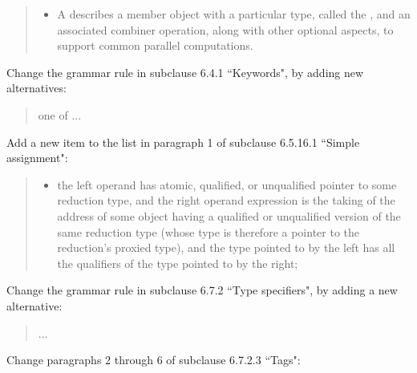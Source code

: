 \begin{quote}
\begin{itemize}
\item
A
describes a member object with a particular type,
called the
,
and an associated combiner operation,
along with other optional aspects,
to support common parallel computations.
\end{itemize}
\end{quote}

Change the grammar rule in subclause 6.4.1 ``Keywords",
by adding new alternatives:

\begin{quote}
\begin{bnf}
\textnormal{one of}\br
...\br
{}\br
{}\br
{}\br
{}\br
{}\br
{}\br
{}\br
{}
\end{bnf}
\end{quote}

Add a new item to the list
in paragraph 1 of subclause 6.5.16.1 ``Simple assignment":

\begin{quote}
\begin{itemize}
\item
the left operand has atomic, qualified, or unqualified
pointer to some reduction type,
and the right operand expression
is the taking of the address
of some object having a qualified or unqualified version
of the same reduction type
(whose type is therefore a pointer to the reduction's proxied type),
and the type pointed to by the left
has all the qualifiers of the type pointed to by the right;
\end{itemize}
\end{quote}

Change the grammar rule in subclause 6.7.2 ``Type specifiers",
by adding a new alternative:

\begin{quote}
\begin{bnf}
\br
...
\br
{}
\end{bnf}
\end{quote}

Change paragraphs 2 through 6 of subclause 6.7.2.3 ``Tags":

